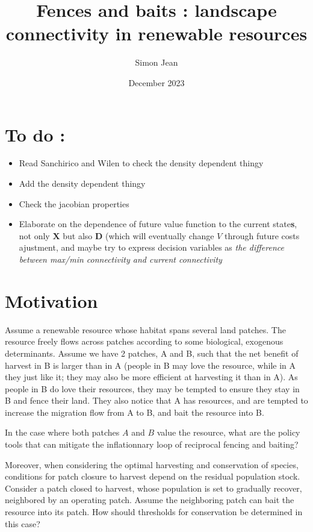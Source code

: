 \documentclass{article}
\title{Fences and baits : landscape connectivity in renewable resources}
\author{Simon Jean}
\date{December 2023}
\begin{document}
\maketitle

\section*{To do :}
\begin{itemize}
\item Read Sanchirico and Wilen to check the density dependent thingy
\item Add the density dependent thingy
\item Check the jacobian properties
\item Elaborate on the dependence of future value function to the current state\textbf{s}, not only $\mathbf{X}$ but also $\mathbf{D}$ (which will eventually change $V$ through future costs ajustment, and maybe try to express decision variables as \textit{the difference between max/min connectivity and current connectivity}
\end{itemize}

\newpage

\section{Motivation}
Assume a renewable resource whose habitat spans several land patches. The resource freely flows across patches according to some biological, exogenous determinants.  Assume we have 2 patches, A and B, such that the net benefit of harvest in B is larger than in A (people in B may love the resource, while in A they just like it; they may also be more efficient at harvesting it than in A). As people in B do love their resources, they may be tempted to ensure they stay in B and fence their land. They also notice that A has resources, and are tempted to increase the migration flow from A to B, and bait the resource into B. 

In the case where both patches $A$ and $B$ value the resource, what are the policy tools that can mitigate the inflationnary loop of reciprocal fencing and baiting?

Moreover, when considering the optimal harvesting and conservation of species, conditions for patch closure to harvest depend on the residual population stock. Consider a patch closed to harvest, whose population is set to gradually recover, neighbored by an operating patch. Assume the neighboring patch can bait the resource into its patch. How should thresholds for conservation be determined in this case? 
\end{document}
